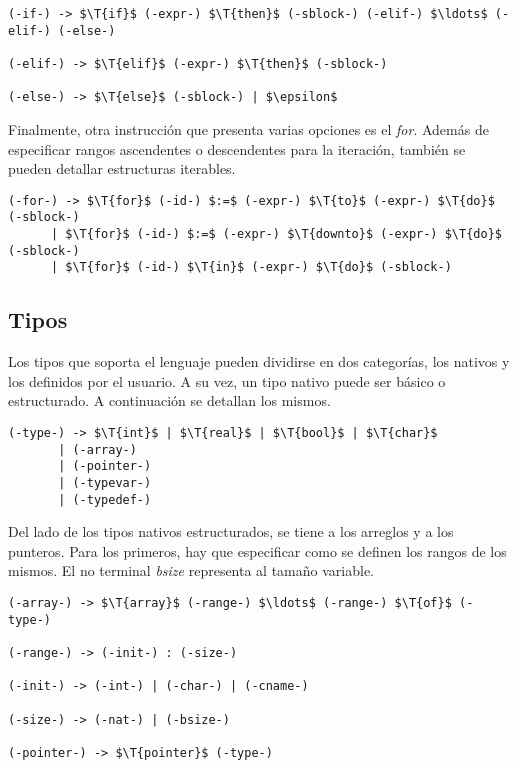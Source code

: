 \documentclass{article}
\begin{document}
\begin{lstlisting}[style = syntax]
(-if-) -> $\T{if}$ (-expr-) $\T{then}$ (-sblock-) (-elif-) $\ldots$ (-elif-) (-else-)

(-elif-) -> $\T{elif}$ (-expr-) $\T{then}$ (-sblock-)

(-else-) -> $\T{else}$ (-sblock-) | $\epsilon$ 
\end{lstlisting}

Finalmente, otra instrucción que presenta varias opciones es el \textit{for}.
Además de especificar rangos ascendentes o descendentes para la iteración, también se pueden detallar estructuras iterables.

\begin{lstlisting}[style = syntax]
(-for-) -> $\T{for}$ (-id-) $:=$ (-expr-) $\T{to}$ (-expr-) $\T{do}$ (-sblock-)
      | $\T{for}$ (-id-) $:=$ (-expr-) $\T{downto}$ (-expr-) $\T{do}$ (-sblock-)
      | $\T{for}$ (-id-) $\T{in}$ (-expr-) $\T{do}$ (-sblock-)
\end{lstlisting}

\subsection{Tipos}

Los tipos que soporta el lenguaje pueden dividirse en dos categorías, los nativos y los definidos por el usuario.
A su vez, un tipo nativo puede ser básico o estructurado.
A continuación se detallan los mismos.

\begin{lstlisting}[style = syntax]
(-type-) -> $\T{int}$ | $\T{real}$ | $\T{bool}$ | $\T{char}$
       | (-array-)
       | (-pointer-)
       | (-typevar-)
       | (-typedef-)
\end{lstlisting}

Del lado de los tipos nativos estructurados, se tiene a los arreglos y a los punteros.
Para los primeros, hay que especificar como se definen los rangos de los mismos.
El no terminal \textit{bsize} representa al tamaño variable.

\begin{lstlisting}[style = syntax]
(-array-) -> $\T{array}$ (-range-) $\ldots$ (-range-) $\T{of}$ (-type-)

(-range-) -> (-init-) : (-size-)

(-init-) -> (-int-) | (-char-) | (-cname-)

(-size-) -> (-nat-) | (-bsize-)

(-pointer-) -> $\T{pointer}$ (-type-)
\end{lstlisting}
\end{document}
